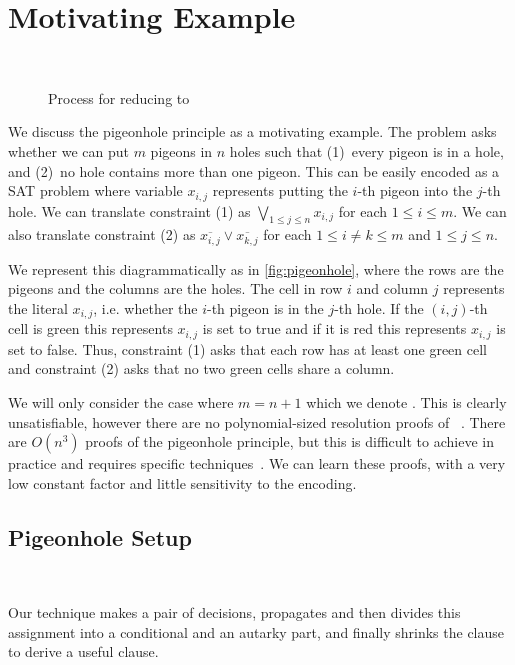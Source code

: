 \section{Motivating Example}~\label{sec:motivatex}

\begin{figure*}[!t]
    \centering
    
    \caption{Process for reducing  to }
  \end{figure*}

We discuss the pigeonhole principle as a motivating example. The problem asks 
whether we can put $m$ pigeons in $n$ holes such that (1)~every pigeon is in a 
hole, and (2)~no hole contains more than one pigeon. This can be easily 
encoded as a SAT problem where variable $x_{i, j}$ represents putting the 
$i$-th pigeon into the $j$-th hole. We can translate constraint (1) as $\bigvee_{1 \leq j \leq n} x_{i, j}$ for each $1 \leq i \leq m$. We can also translate constraint (2) as $\overline{x_{i, j}} \lor \overline{x_{k, j}}$ for each $ 1 \leq i \neq k \leq m$ and $1 \leq j \leq n$.

We represent this diagrammatically as in \autoref{fig:pigeonhole}, where the rows are the pigeons and the columns are the holes. The cell in row $i$ and column $j$ represents the literal $x_{i, j}$, i.e. whether the $i$-th pigeon is in the $j$-th hole. If the $(i, j)$-th cell is green this represents $x_{i, j}$ is set to true and if it is red this represents $x_{i, j}$ is set to false. Thus, constraint (1) asks that each row has at least one green cell and constraint (2) asks that no two green cells share a column.

We will only consider the case where $m = n + 1$ which we denote . This is clearly unsatisfiable, however there are no polynomial-sized resolution proofs of ~\cite{hakenpigeonhole}. There are $O(n^3)$ \pr proofs of the pigeonhole principle, but this is difficult to achieve in practice and requires specific techniques~\cite{prclauses}. We can learn these proofs, with a very low constant factor and little sensitivity to the encoding.


\subsection{Pigeonhole Setup}~\label{subsec:pigeonhole-setup}

Our technique makes a pair of decisions, propagates and then divides this assignment into a conditional and an autarky part, and finally shrinks the clause to derive a useful \pr clause.

